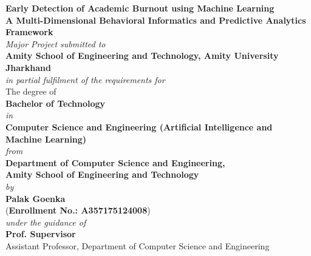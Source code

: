 \documentclass[12pt,a4paper,oneside]{report}
\begin{document}

\begin{titlepage}
    \begin{center}
        \vspace*{0.3cm}
        {\LARGE \textbf{Early Detection of Academic Burnout using Machine Learning}}\\[0.3cm]
        {\large \textbf{A Multi-Dimensional Behavioral Informatics and Predictive Analytics Framework}}\\[1.2cm]
        
        \textit{Major Project submitted to}\\[0.2cm]
        \textbf{Amity School of Engineering and Technology, Amity University Jharkhand}\\[0.2cm]
        \textit{in partial fulfilment of the requirements for}\\[0.2cm]
        The degree of\\[0.2cm]
        {\Large \textbf{Bachelor of Technology}}\\[0.2cm]
        \textit{in}\\[0.2cm]
        {\large \textbf{Computer Science and Engineering (Artificial Intelligence and Machine Learning)}}\\[0.2cm]
        \textit{from}\\[0.2cm]
        \textbf{Department of Computer Science and Engineering,}\\[0.1cm]
        \textbf{Amity School of Engineering and Technology}\\[1.0cm]
        
        \textit{by}\\[0.2cm]
        {\Large \textbf{Palak Goenka}}\\[0.1cm]
        (\textbf{Enrollment No.: A357175124008})\\[0.8cm]
        
        \textit{under the guidance of}\\[0.2cm]
        {\large \textbf{Prof. Supervisor}}\\[0.1cm]
        Assistant Professor, Department of Computer Science and Engineering\\[1.2cm]
        

\end{center}
\end{titlepage}
\end{document}
